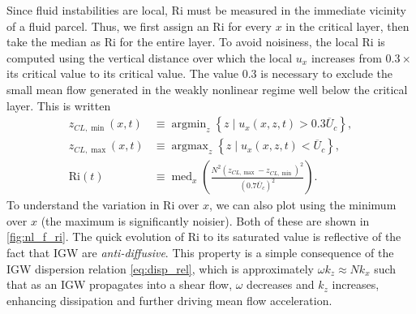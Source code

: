 \documentclass[
        fleqn,
        usenatbib,
    ]{mnras}
\newcommand*{\p}[1]{\left(#1\right)}
\newcommand*{\z}[1]{\left\{#1\right\}}
\DeclareMathOperator*{\argmin}{argmin}
\DeclareMathOperator*{\argmax}{argmax}
\DeclareMathOperator*{\med}{med}
\begin{document}
Since fluid instabilities are local, $\mathrm{Ri}$ must be measured in the
immediate vicinity of a fluid parcel. Thus, we first assign an $\mathrm{Ri}$ for
every $x$ in the critical layer, then take the median as $\mathrm{Ri}$ for the
entire layer. To avoid noisiness, the local $\mathrm{Ri}$ is computed using the
vertical distance over which the local $u_x$ increases from $0.3 \times$ its
critical value to its critical value. The value $0.3$ is necessary to exclude
the small mean flow generated in the weakly nonlinear regime well below the
critical layer. This is written
\begin{align}
    z_{CL, \min}(x, t) &\equiv \argmin_z
        \z{z\mid u_x(x, z, t) > 0.3\overline{U}_c},\\
    z_{CL, \max}(x, t) &\equiv \argmax_z
        \z{z\mid u_x(x, z, t) < \overline{U}_c},\\
    \mathrm{Ri}(t) &\equiv
        \med_x\p{\frac{N^2 \p{z_{CL, \max} - z_{CL, \min}}^2}{(0.7
            \overline{U}_c)^2}}.\label{eq:ri_med_def}
\end{align}
To understand the variation in $\mathrm{Ri}$ over $x$, we can also plot using
the minimum over $x$ (the maximum is significantly noisier). Both of these are
shown in \autoref{fig:nl_f_ri}. The quick evolution of $\mathrm{Ri}$ to its
saturated value is reflective of the fact that IGW are \emph{anti-diffusive}.
This property is a simple consequence of the IGW dispersion relation
\autoref{eq:disp_rel}, which is approximately $\omega k_z \approx Nk_x$ such
that as an IGW propagates into a shear flow, $\omega$ decreases and $k_z$
increases, enhancing dissipation and further driving mean flow acceleration.
\end{document}
